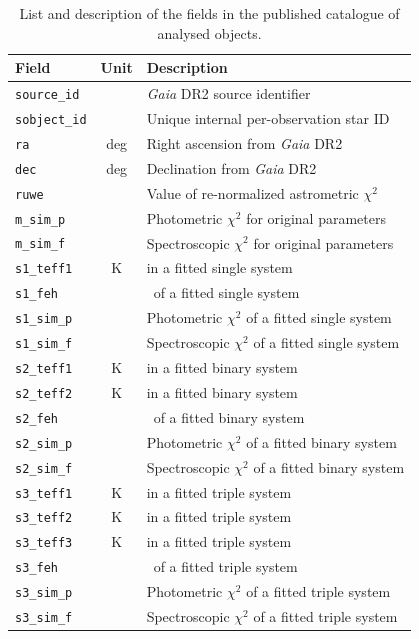 \begin{table}
	\centering
	\caption{List and description of the fields in the published catalogue of analysed objects.}
	\label{tab:out_table}
	\begin{tabular}{l c l}
		\hline
		Field & Unit & Description \\ 
		\hline
		\texttt{source\_id} & & {\it Gaia} DR2 source identifier \\
		\texttt{sobject\_id} & & Unique internal per-observation star ID \\
		\texttt{ra} & deg & Right ascension from {\it Gaia} DR2 \\
		\texttt{dec} & deg & Declination from {\it Gaia} DR2 \\
		\texttt{ruwe} & & Value of re-normalized astrometric $\chi^2$ \\
		
		\texttt{m\_sim\_p} & & Photometric $\chi^2$ for original parameters \\
		\texttt{m\_sim\_f} & & Spectroscopic $\chi^2$ for original parameters \\
		
		\texttt{s1\_teff1} & K & \Teffn{1} in a fitted single system \\
		\texttt{s1\_feh} & & \Feh\ of a fitted single system \\
		\texttt{s1\_sim\_p} & & Photometric $\chi^2$ of a fitted single system \\
		\texttt{s1\_sim\_f} & & Spectroscopic $\chi^2$ of a fitted single system\\
		
		\texttt{s2\_teff1} & K & \Teffn{1} in a fitted binary system \\	
		\texttt{s2\_teff2} & K & \Teffn{2} in a fitted binary system \\
		\texttt{s2\_feh} & & \Feh\ of a fitted binary system \\
		\texttt{s2\_sim\_p} & & Photometric $\chi^2$ of a fitted binary system \\
		\texttt{s2\_sim\_f} & & Spectroscopic $\chi^2$ of a fitted binary system\\
		
		\texttt{s3\_teff1} & K & \Teffn{1} in a fitted triple system \\	
		\texttt{s3\_teff2} & K & \Teffn{2} in a fitted triple system \\
		\texttt{s3\_teff3} & K & \Teffn{3} in a fitted triple system \\
		\texttt{s3\_feh} & & \Feh\ of a fitted triple system \\
		\texttt{s3\_sim\_p} & & Photometric $\chi^2$ of a fitted triple system \\
		\texttt{s3\_sim\_f} & & Spectroscopic $\chi^2$ of a fitted triple system\\
		

\end{tabular}
\end{table}
